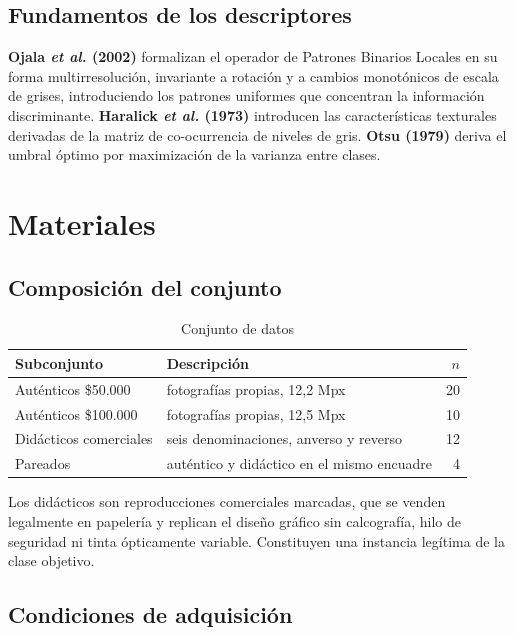 \documentclass[conference]{IEEEtran}
\begin{document}
\subsection{Fundamentos de los descriptores}
\textbf{Ojala \textit{et al.} (2002)} \cite{ojala2002} formalizan el
operador de Patrones Binarios Locales en su forma multirresolución,
invariante a rotación y a cambios monotónicos de escala de grises,
introduciendo los patrones uniformes que concentran la información
discriminante. \textbf{Haralick \textit{et al.} (1973)}
\cite{haralick1973} introducen las características texturales derivadas
de la matriz de co-ocurrencia de niveles de gris. \textbf{Otsu (1979)}
\cite{otsu1979} deriva el umbral óptimo por maximización de la varianza
entre clases.

\section{Materiales}
\label{sec:materiales}

\subsection{Composición del conjunto}

\begin{table}[h]
\centering
\caption{Conjunto de datos}
\label{tab:datos}
\small
\begin{tabular}{@{}llr@{}}
\toprule
\textbf{Subconjunto} & \textbf{Descripción} & \textbf{$n$} \\
\midrule
Auténticos \$50.000  & fotografías propias, 12{,}2 Mpx & 20 \\
Auténticos \$100.000 & fotografías propias, 12{,}5 Mpx & 10 \\
Didácticos comerciales & seis denominaciones, anverso y reverso & 12 \\
Pareados & auténtico y didáctico en el mismo encuadre & 4 \\
\bottomrule
\end{tabular}
\end{table}

Los didácticos son reproducciones comerciales marcadas, que se venden
legalmente en papelería y replican el diseño gráfico sin calcografía,
hilo de seguridad ni tinta ópticamente variable. Constituyen una
instancia legítima de la clase objetivo.

\subsection{Condiciones de adquisición}
\end{document}

